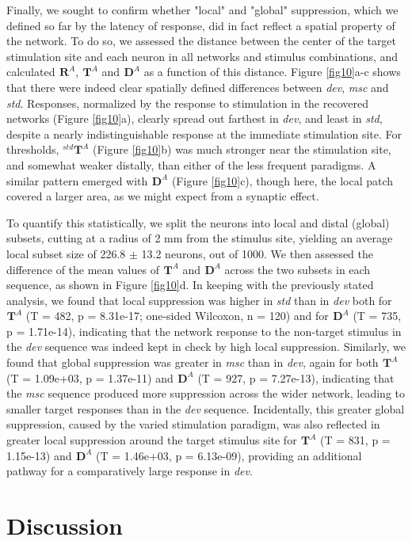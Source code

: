 \documentclass[pdflatex,referee,iicol,sn-basic]{sn-jnl}
\newcommand{\dev}{\textit{dev}}
\newcommand{\msc}{\textit{msc}}
\newcommand{\std}{\textit{std}}
\renewcommand{\R}[3][]{{}^{#1}_{}\mathbf{R}^{#2}_{#3}}
\renewcommand{\T}[3][]{{}^{#1}_{}\mathbf{T}^{#2}_{#3}}
\newcommand{\D}[3][]{{}^{#1}_{}\mathbf{D}^{#2}_{#3}}
\newcommand{\refpanel}[2]{Figure \ref{fig#1}\lowercase{#2}}
\begin{document}
Finally, we sought to confirm whether "local" and "global" suppression, which we defined so far by the latency of response, did in fact reflect a spatial property of the network. To do so, we assessed the distance between the center of the target stimulation site and each neuron in all networks and stimulus combinations, and calculated $\R{A}{}$, $\T{A}{}$ and $\D{A}{}$ as a function of this distance. \refpanel{10}{a-c} shows that there were indeed clear spatially defined differences between \dev{}, \msc{} and \std{}. Responses, normalized by the response to stimulation in the recovered networks (\refpanel{10}{a}), clearly spread out farthest in \dev{}, and least in \std{}, despite a nearly indistinguishable response at the immediate stimulation site. For thresholds, $\T[std]{A}{}$ (\refpanel{10}{b}) was much stronger near the stimulation site, and somewhat weaker distally, than either of the less frequent paradigms. A similar pattern emerged with $\D{A}{}$ (\refpanel{10}{c}), though here, the local patch covered a larger area, as we might expect from a synaptic effect.

To quantify this statistically, we split the neurons into local and distal (global) subsets, cutting at a radius of 2 mm from the stimulus site, yielding an average local subset size of 226.8 $\pm$ 13.2 neurons, out of 1000. We then assessed the difference of the mean values of $\T{A}{}$ and $\D{A}{}$ across the two subsets in each sequence, as shown in \refpanel{10}{d}. In keeping with the previously stated analysis, we found that local suppression was higher in \std{} than in \dev{} both for $\T{A}{}$ (T = 482, p = 8.31e-17; one-sided Wilcoxon, n = 120) and for $\D{A}{}$ (T = 735, p = 1.71e-14), indicating that the network response to the non-target stimulus in the \dev{} sequence was indeed kept in check by high local suppression. Similarly, we found that global suppression was greater in \msc{} than in \dev{}, again for both $\T{A}{}$ (T = 1.09e+03, p = 1.37e-11) and $\D{A}{}$ (T = 927, p = 7.27e-13), indicating that the \msc{} sequence produced more suppression across the wider network, leading to smaller target responses than in the \dev{} sequence. Incidentally, this greater global suppression, caused by the varied stimulation paradigm, was also reflected in greater local suppression around the target stimulus site for $\T{A}{}$ (T = 831, p = 1.15e-13) and $\D{A}{}$ (T = 1.46e+03, p = 6.13e-09), providing an additional pathway for a comparatively large response in \dev{}.

\section{Discussion}\label{sec-discussion}
\end{document}
